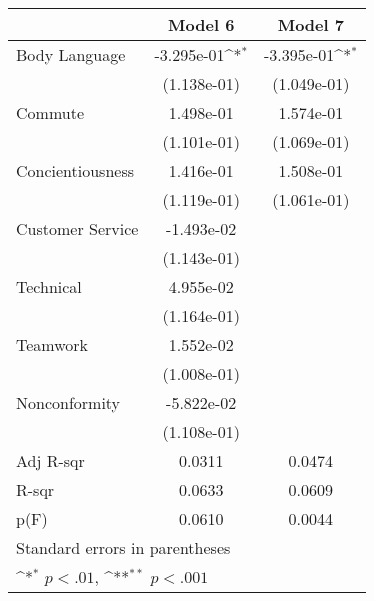 
{
\def\sym#1{\ifmmode^{#1}\else\(^{#1}\)\fi}
\begin{tabular}{l*{2}{c}}
    \toprule
                     & \multicolumn{1}{c}{Model 6} & \multicolumn{1}{c}{Model 7} \\
    \midrule
    Body Language    & -3.295e-01\sym{*}           & -3.395e-01\sym{*}           \\
                     & (1.138e-01)                 & (1.049e-01)                 \\
    \addlinespace
    Commute          & 1.498e-01                   & 1.574e-01                   \\
                     & (1.101e-01)                 & (1.069e-01)                 \\
    \addlinespace
    Concientiousness & 1.416e-01                   & 1.508e-01                   \\
                     & (1.119e-01)                 & (1.061e-01)                 \\
    \addlinespace
    Customer Service & -1.493e-02                  &                             \\
                     & (1.143e-01)                 &                             \\
    \addlinespace
    Technical        & 4.955e-02                   &                             \\
                     & (1.164e-01)                 &                             \\
    \addlinespace
    Teamwork         & 1.552e-02                   &                             \\
                     & (1.008e-01)                 &                             \\
    \addlinespace
    Nonconformity    & -5.822e-02                  &                             \\
                     & (1.108e-01)                 &                             \\
    \midrule
    Adj R-sqr        & 0.0311                      & 0.0474                      \\
    R-sqr            & 0.0633                      & 0.0609                      \\
    p(F)             & 0.0610                      & 0.0044                      \\
    \bottomrule
    \multicolumn{3}{l}{\footnotesize Standard errors in parentheses}             \\
    \multicolumn{3}{l}{\footnotesize \sym{*} \(p<.01\), \sym{**} \(p<.001\)}     \\
\end{tabular}
}